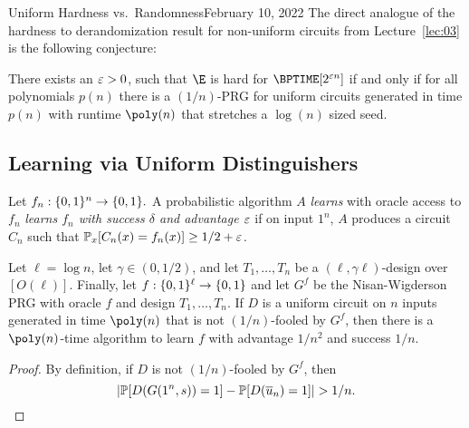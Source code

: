 \begin{lecture}{4}{Uniform Hardness vs.\ Randomness}{February 10, 2022}
The direct analogue of the hardness to derandomization result for non-uniform
circuits from Lecture~\ref{lec:03} is the following conjecture:

\begin{conjecture}
	There exists an $\varepsilon > 0$, such that $\E$ is hard for
	$\BPTIME\brac{2^{\eps n}}$ if and only if for all polynomials $p(n)$ there
	is a $(1 / n)$-PRG for uniform circuits generated in time $p(n)$ with
	runtime $\poly(n)$ that stretches a $\log(n)$ sized seed.
\end{conjecture}

\subsection{Learning via Uniform Distinguishers}


\begin{definition}
  Let $f_n : \{0, 1\}^n \to \{0, 1\}.$ A probabilistic algorithm $A$
  \emph{learns} with oracle access to $f_n$ \emph{learns $f_n$ with success
  $\delta$ and advantage $\varepsilon$} if on input $1^n$, $A$ produces a circuit
  $C_n$ such that $\mathbb{P}_x [C_n(x) = f_n(x)] \geq 1/2 + \varepsilon$.
\end{definition}

\begin{proposition}\label{prop:learning}
  Let $\ell = \log{n}$, let $\gamma \in (0, 1/2)$, and let $T_1, \dots, T_n$ be
  a $(\ell, \gamma \ell)$-design over $[O(\ell)]$. Finally, let $f :
  \{0,1\}^\ell \to \{0, 1\}$ and let $G^f$ be the Nisan-Wigderson PRG with
  oracle $f$ and design $T_1, \dots, T_n$. If $D$ is a uniform circuit on $n$
  inputs generated in time $\poly(n)$ that is not $(1/n)$-fooled by $G^f$, then
  there is a $\poly(n)$-time algorithm to learn $f$ with advantage $1/n^2$ and
  success $1/n$.
\end{proposition}

\begin{proof}
  By definition, if $D$ is not $(1/n)$-fooled by $G^f$, then
  \[
    \lvert\mathbb{P}[D(G(1^n, s)) = 1] - \mathbb{P}[D(\overline{u}_n) = 1]\rvert > 1/n.
  \]


\end{proof}
\end{lecture}

